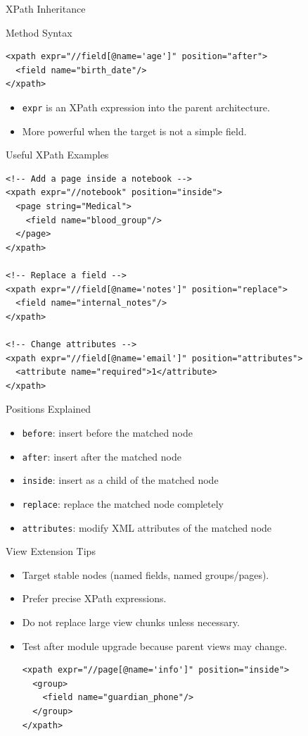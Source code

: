 \begin{frame}[fragile]{XPath Inheritance}
\begin{block}{Method Syntax}
\begin{lstlisting}[style=xml]
<xpath expr="//field[@name='age']" position="after">
  <field name="birth_date"/>
</xpath>
\end{lstlisting}
\end{block}
	\begin{itemize}
		\item \texttt{expr} is an XPath expression into the parent architecture.
		\item More powerful when the target is not a simple field.
	\end{itemize}
\end{frame}

\begin{frame}[fragile]{Useful XPath Examples}
\begin{lstlisting}[style=xml]
<!-- Add a page inside a notebook -->
<xpath expr="//notebook" position="inside">
  <page string="Medical">
	<field name="blood_group"/>
  </page>
</xpath>

<!-- Replace a field -->
<xpath expr="//field[@name='notes']" position="replace">
  <field name="internal_notes"/>
</xpath>

<!-- Change attributes -->
<xpath expr="//field[@name='email']" position="attributes">
  <attribute name="required">1</attribute>
</xpath>
\end{lstlisting}
\end{frame}

\begin{frame}[fragile]{Positions Explained}
	\begin{itemize}
		\item \texttt{before}: insert before the matched node
		\item \texttt{after}: insert after the matched node
		\item \texttt{inside}: insert as a child of the matched node
		\item \texttt{replace}: replace the matched node completely
		\item \texttt{attributes}: modify XML attributes of the matched node
	\end{itemize}
\end{frame}

\begin{frame}[fragile]{View Extension Tips}
	\begin{itemize}
		\item Target stable nodes (named fields, named groups/pages).
		\item Prefer precise XPath expressions.
		\item Do not replace large view chunks unless necessary.
		\item Test after module upgrade because parent views may change.
\begin{lstlisting}[style=xml]
<xpath expr="//page[@name='info']" position="inside">
  <group>
	<field name="guardian_phone"/>
  </group>
</xpath>
\end{lstlisting}
	\end{itemize}
\end{frame}
